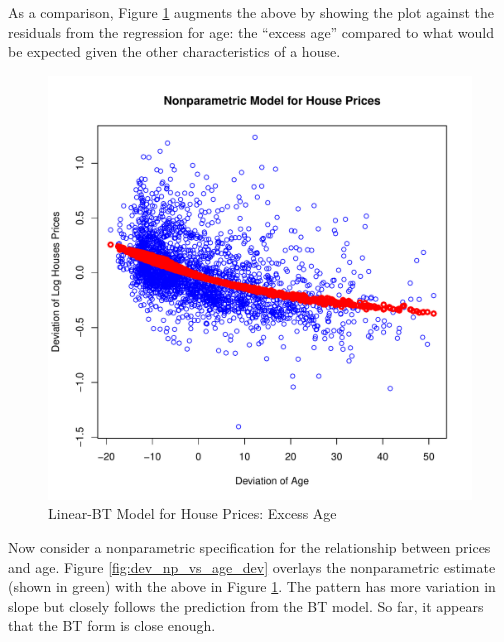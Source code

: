 \pagebreak
As a comparison, Figure \ref{fig:dev_vs_age_dev} 
augments the above by showing the plot against the 
residuals from the regression for age:
the ``excess age'' compared to what would be 
expected given the other characteristics of a house.


\begin{figure}[h!]
  \centering
  \includegraphics[scale = 0.5, keepaspectratio=true]{../Figures/dev_vs_age_dev}
  \caption{Linear-BT Model for House Prices: Excess Age} \label{fig:dev_vs_age_dev}
\end{figure}

\clearpage
Now consider a nonparametric specification for 
the relationship between prices and age.
Figure \ref{fig:dev_np_vs_age_dev} 
overlays the nonparametric estimate (shown in green) with the above in 
Figure \ref{fig:dev_vs_age_dev}.
The pattern has more variation in slope but 
closely follows the prediction from the BT model. 
So far, it appears that the BT form
is close enough.

